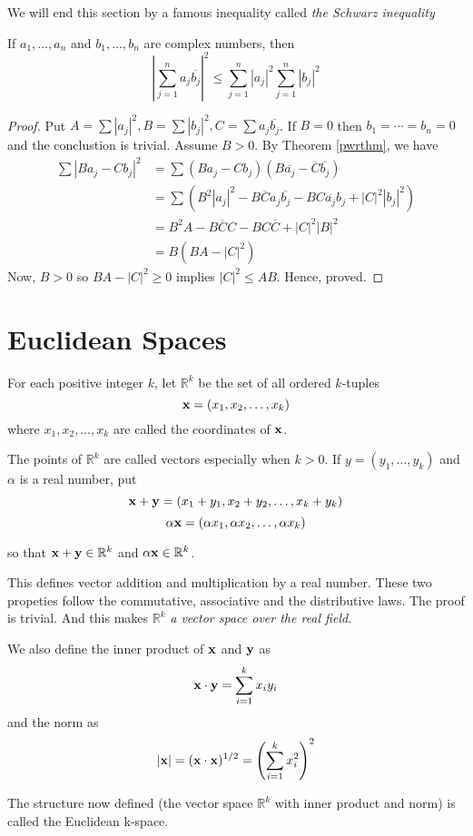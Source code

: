 We will end this section by a famous inequality called {\it the Schwarz inequality}

\begin{thm}
	If $a_1, \dots, a_n$ and $b_1, \dots, b_n$ are complex numbers, then
	$$
		\left| \sum_{j=1}^n a_j \overline{b_j} \right| ^ 2
		\leq
		\sum_{j=1}^n |a_j|^2 \sum_{j=1}^n |b_j|^2
	$$
	\begin{proof}
		Put $A = \sum |a_j|^2, B = \sum |b_j|^2, C = \sum a_j \overline{b_j}$.
		If $B = 0$ then $b_1 = \cdots = b_n = 0$ and the conclustion is trivial.
		Assume $B > 0$. By Theorem \ref{pwrthm}, we have
		\begin{align*}
			\sum |B a_j - C b_j|^2
				& = \sum (B a_j - C b_j)(B \overline{a_j} - \overline{C} \overline{b_j}) \\
				& = \sum ( B^2 |a_j|^2
					- B \overline{C} a_j \overline{b_j}
					- B C \overline{a_j} b_j
					+ |C|^2 |b_j|^2 ) \\
				& = B^2 A - B \overline{C} C - B C \overline{C} + |C|^2 |B|^2 \\
				& = B (BA - |C|^2)
		\end{align*}
		Now, $B > 0$ so $BA - |C|^2 \geq 0$ implies $|C|^2 \leq AB$.
		Hence, proved.
	\end{proof}
\end{thm}


\section{Euclidean Spaces}

\begin{defn}
	For each positive integer $k$, let $\mathbb{R}^k$ be the set of all ordered $k$-tuples
	$$ {\bf x} = (x_1, x_2, \dots, x_k) $$
	where $x_1, x_2, \dots, x_k$ are called the coordinates of ${\bf x}$.

The points of $\mathbb{R}^k$ are called vectors especially when $k > 0$.
If $y = (y_1, \dots, y_k)$ and $\alpha$ is a real number, put
$$ {\bf x} + {\bf y} = (x_1 + y_1, x_2 + y_2, \dots, x_k + y_k) $$
$$ \alpha {\bf x} = (\alpha x_1, \alpha x_2, \dots, \alpha x_k) $$

so that ${\bf x} + {\bf y} \in \mathbb{R}^k$ and $\alpha {\bf x} \in \mathbb{R}^k$.

This defines vector addition and multiplication by a real number.
These two propeties follow the commutative, associative and the distributive laws.
The proof is trivial. And this makes $\mathbb{R}^k$ {\it a vector space over the real field}.

We also define the inner product of ${\bf x}$ and ${\bf y}$ as
$$
{\bf x} \cdot {\bf y} = \sum_{i=1}^k x_i y_i
$$
and the norm as
$$
|{\bf x}| = ({\bf x} \cdot {\bf x})^{1/2} = \left( \sum_{i=1}^k x_i^2 \right)^2
$$

The structure now defined (the vector space $\mathbb{R}^k$ with inner product and norm)
is called the Euclidean k-space.
\end{defn}


